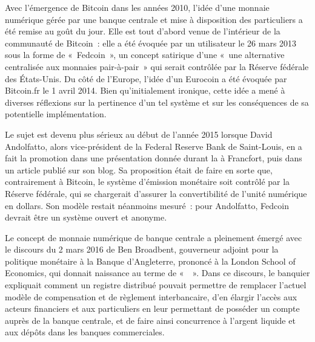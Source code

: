 Avec l'émergence de Bitcoin dans les années 2010, l'idée d'une monnaie numérique gérée par une banque centrale et mise à disposition des particuliers a été remise au goût du jour. Elle est tout d'abord venue de l'intérieur de la communauté de Bitcoin~: elle a été évoquée par un utilisateur le 26 mars 2013 sous la forme de «~Fedcoin~», un concept satirique d'une «~une alternative centralisée aux monnaies pair-à-pair~» qui serait contrôlée par la Réserve fédérale des États-Unis. Du côté de l'Europe, l'idée d'un Eurocoin a été évoquée par Bitcoin.fr le 1\ier{} avril 2014. Bien qu'initialement ironique, cette idée a mené à diverses réflexions sur la pertinence d'un tel système et sur les conséquences de sa potentielle implémentation.

Le sujet est devenu plus sérieux au début de l'année 2015 lorsque David Andolfatto, alors vice-président de la Federal Reserve Bank de Saint-Louis, en a fait la promotion dans une présentation donnée durant la  à Francfort, puis dans un article publié sur son blog. Sa proposition était de faire en sorte que, contrairement à Bitcoin, le système d'émission monétaire soit contrôlé par la Réserve fédérale, qui se chargerait d'assurer la convertibilité de l'unité numérique en dollars. Son modèle restait néanmoins mesuré~: pour Andolfatto, Fedcoin devrait être un système ouvert et anonyme.

Le concept de monnaie numérique de banque centrale a pleinement émergé avec le discours du 2 mars 2016 de Ben Broadbent, gouverneur adjoint pour la politique monétaire à la Banque d'Angleterre, prononcé à la London School of Economics, qui donnait naissance au terme de «~~». Dans ce discours, le banquier expliquait comment un registre distribué pouvait permettre de remplacer l'actuel modèle de compensation et de règlement interbancaire, d'en élargir l'accès aux acteurs financiers et aux particuliers en leur permettant de posséder un compte auprès de la banque centrale, et de faire ainsi concurrence à l'argent liquide et aux dépôts dans les banques commerciales.

